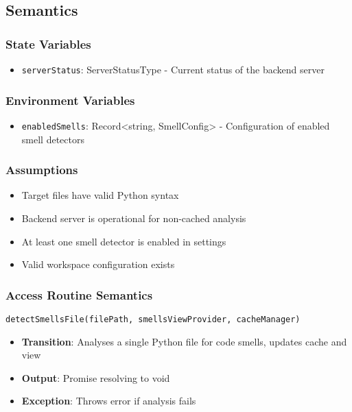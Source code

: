 \documentclass[12pt, titlepage]{article}
\begin{document}
\subsection{Semantics}

\subsubsection{State Variables}
\begin{itemize}
\item \texttt{serverStatus}: ServerStatusType - Current status of the backend server
\end{itemize}

\subsubsection{Environment Variables}
\begin{itemize}
\item \texttt{enabledSmells}: Record<string, SmellConfig> - Configuration of enabled smell detectors
\end{itemize}

\subsubsection{Assumptions}
\begin{itemize}
\item Target files have valid Python syntax
\item Backend server is operational for non-cached analysis
\item At least one smell detector is enabled in settings
\item Valid workspace configuration exists
\end{itemize}

\subsubsection{Access Routine Semantics}
\texttt{detectSmellsFile(filePath, smellsViewProvider, cacheManager)}
\begin{itemize}
\item \textbf{Transition}: Analyses a single Python file for code smells, updates cache and view
\item \textbf{Output}: Promise resolving to void
\item \textbf{Exception}: Throws error if analysis fails
\end{itemize}
\end{document}
